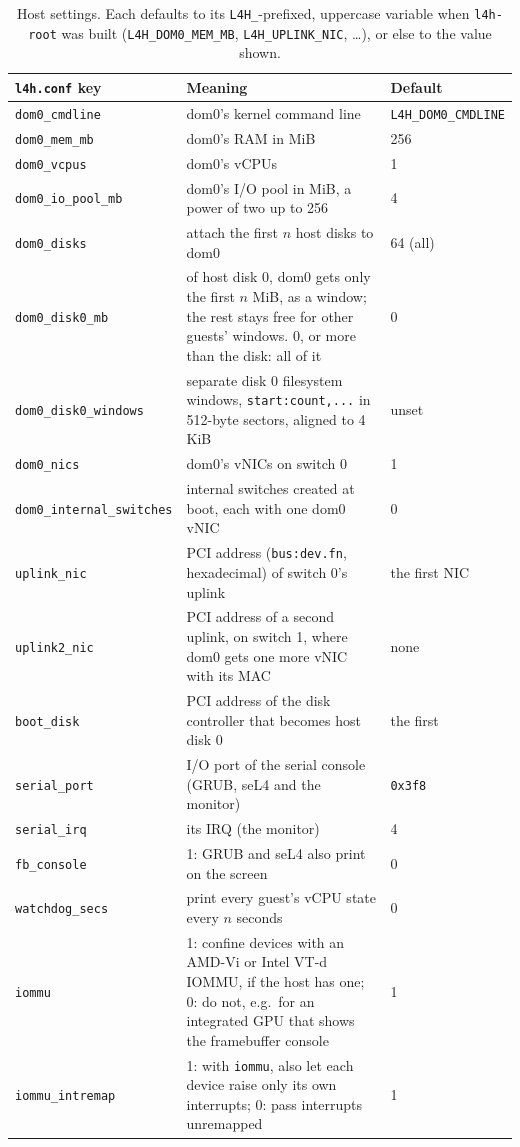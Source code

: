 \documentclass[11pt,a4paper]{report}
\newcommand{\file}[1]{\texttt{#1}}
\begin{document}
\begin{table}[ht]
\centering
\begin{tabularx}{\linewidth}{@{}lXl@{}}
\toprule
\file{l4h.conf} key & Meaning & Default \\
\midrule
\texttt{dom0\_cmdline} & dom0's kernel command line & \texttt{L4H\_DOM0\_CMDLINE} \\
\texttt{dom0\_mem\_mb} & dom0's RAM in MiB & 256 \\
\texttt{dom0\_vcpus} & dom0's vCPUs & 1 \\
\texttt{dom0\_io\_pool\_mb} & dom0's I/O pool in MiB, a power of two up to 256 & 4 \\
\texttt{dom0\_disks} & attach the first $n$ host disks to dom0 & 64 (all) \\
\texttt{dom0\_disk0\_mb} & of host disk 0, dom0 gets only the first $n$ MiB, as
  a window; the rest stays free for other guests' windows. 0, or more than
  the disk: all of it & 0 \\
\texttt{dom0\_disk0\_windows} & separate disk 0 filesystem windows,
\texttt{start:count,...} in 512-byte sectors, aligned to 4 KiB & unset \\

\texttt{dom0\_nics} & dom0's vNICs on switch 0 & 1 \\
\texttt{dom0\_internal\_switches} & internal switches created at boot, each
  with one dom0 vNIC & 0 \\
\texttt{uplink\_nic} & PCI address (\texttt{bus:dev.fn}, hexadecimal) of
  switch 0's uplink & the first NIC \\
\texttt{uplink2\_nic} & PCI address of a second uplink, on switch 1, where
  dom0 gets one more vNIC with its MAC & none \\
\texttt{boot\_disk} & PCI address of the disk controller that becomes host
  disk 0 & the first \\
\texttt{serial\_port} & I/O port of the serial console (GRUB, seL4 and the
  monitor) & \texttt{0x3f8} \\
\texttt{serial\_irq} & its IRQ (the monitor) & 4 \\
\texttt{fb\_console} & 1: GRUB and seL4 also print on the screen & 0 \\
\texttt{watchdog\_secs} & print every guest's vCPU state every $n$ seconds
  & 0 \\
\texttt{iommu} & 1: confine devices with an AMD-Vi or Intel VT-d IOMMU, if the host has
  one; 0: do not, e.g.\ for an integrated GPU that shows the framebuffer
  console & 1 \\
\texttt{iommu\_intremap} & 1: with \texttt{iommu}, also let each device raise
  only its own interrupts; 0: pass interrupts unremapped & 1 \\
\bottomrule
\end{tabularx}
\caption{Host settings. Each defaults to its \texttt{L4H\_}-prefixed,
  uppercase variable when \texttt{l4h-root} was built
  (\texttt{L4H\_DOM0\_MEM\_MB}, \texttt{L4H\_UPLINK\_NIC}, \ldots), or else
  to the value shown.}
\label{tab:settings}
\end{table}
\end{document}
